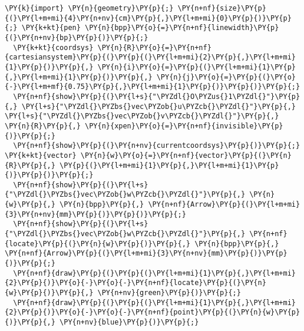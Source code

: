 \begin{Verbatim}[commandchars=\\\{\}]
  \PY{k}{import} \PY{n}{geometry}\PY{p}{;} \PY{n+nf}{size}\PY{p}{(}\PY{l+m+mi}{4}\PY{n+nv}{cm}\PY{p}{,}\PY{l+m+mi}{0}\PY{p}{)}\PY{p}{;} \PY{k+kt}{pen} \PY{n}{bpp}\PY{o}{=}\PY{n+nf}{linewidth}\PY{p}{(}\PY{n+nv}{bp}\PY{p}{)}\PY{p}{;}
  \PY{k+kt}{coordsys} \PY{n}{R}\PY{o}{=}\PY{n+nf}{cartesiansystem}\PY{p}{(}\PY{p}{(}\PY{l+m+mi}{2}\PY{p}{,}\PY{l+m+mi}{1}\PY{p}{)}\PY{p}{,} \PY{n}{i}\PY{o}{=}\PY{p}{(}\PY{l+m+mi}{1}\PY{p}{,}\PY{l+m+mi}{1}\PY{p}{)}\PY{p}{,} \PY{n}{j}\PY{o}{=}\PY{p}{(}\PY{o}{-}\PY{l+m+mf}{0.75}\PY{p}{,}\PY{l+m+mi}{1}\PY{p}{)}\PY{p}{)}\PY{p}{;}
  \PY{n+nf}{show}\PY{p}{(}\PY{l+s}{"\PYZdl{}O\PYZus{}1\PYZdl{}"}\PY{p}{,} \PY{l+s}{"\PYZdl{}\PYZbs{}vec\PYZob{}u\PYZcb{}\PYZdl{}"}\PY{p}{,} \PY{l+s}{"\PYZdl{}\PYZbs{}vec\PYZob{}v\PYZcb{}\PYZdl{}"}\PY{p}{,} \PY{n}{R}\PY{p}{,} \PY{n}{xpen}\PY{o}{=}\PY{n+nf}{invisible}\PY{p}{)}\PY{p}{;}
  \PY{n+nf}{show}\PY{p}{(}\PY{n+nv}{currentcoordsys}\PY{p}{)}\PY{p}{;} \PY{k+kt}{vector} \PY{n}{w}\PY{o}{=}\PY{n+nf}{vector}\PY{p}{(}\PY{n}{R}\PY{p}{,} \PY{p}{(}\PY{l+m+mi}{1}\PY{p}{,}\PY{l+m+mi}{1}\PY{p}{)}\PY{p}{)}\PY{p}{;}
  \PY{n+nf}{show}\PY{p}{(}\PY{l+s}{"\PYZdl{}\PYZbs{}vec\PYZob{}w\PYZcb{}\PYZdl{}"}\PY{p}{,} \PY{n}{w}\PY{p}{,} \PY{n}{bpp}\PY{p}{,} \PY{n+nf}{Arrow}\PY{p}{(}\PY{l+m+mi}{3}\PY{n+nv}{mm}\PY{p}{)}\PY{p}{)}\PY{p}{;}
  \PY{n+nf}{show}\PY{p}{(}\PY{l+s}{"\PYZdl{}\PYZbs{}vec\PYZob{}w\PYZcb{}\PYZdl{}"}\PY{p}{,} \PY{n+nf}{locate}\PY{p}{(}\PY{n}{w}\PY{p}{)}\PY{p}{,} \PY{n}{bpp}\PY{p}{,} \PY{n+nf}{Arrow}\PY{p}{(}\PY{l+m+mi}{3}\PY{n+nv}{mm}\PY{p}{)}\PY{p}{)}\PY{p}{;}
  \PY{n+nf}{draw}\PY{p}{(}\PY{p}{(}\PY{l+m+mi}{1}\PY{p}{,}\PY{l+m+mi}{2}\PY{p}{)}\PY{o}{-}\PY{o}{-}\PY{n+nf}{locate}\PY{p}{(}\PY{n}{w}\PY{p}{)}\PY{p}{,} \PY{n+nv}{green}\PY{p}{)}\PY{p}{;}
  \PY{n+nf}{draw}\PY{p}{(}\PY{p}{(}\PY{l+m+mi}{1}\PY{p}{,}\PY{l+m+mi}{2}\PY{p}{)}\PY{o}{-}\PY{o}{-}\PY{n+nf}{point}\PY{p}{(}\PY{n}{w}\PY{p}{)}\PY{p}{,} \PY{n+nv}{blue}\PY{p}{)}\PY{p}{;}
\end{Verbatim}
